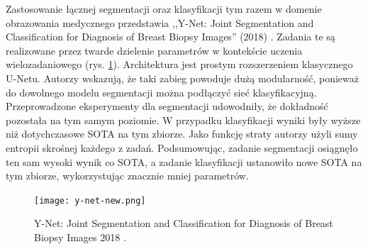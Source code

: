 \vspace{0.5cm}
Zastosowanie łącznej segmentacji oraz klasyfikacji tym razem w domenie obrazowania medycznego przedstawia ,,Y-Net: Joint Segmentation and Classification for Diagnosis of Breast Biopsy Images'' (2018) \cite{mehta2018net}. Zadania te są realizowane przez twarde dzielenie parametrów w kontekście uczenia wielozadaniowego (rys. \ref{fig:y-net}). Architektura jest prostym rozszerzeniem klasycznego U-Netu. Autorzy wskazują, że taki zabieg powoduje dużą modularność, ponieważ do dowolnego modelu segmentacji można podłączyć sieć klasyfikacyjną. Przeprowadzone eksperymenty dla segmentacji udowodniły, że dokładność pozostała na tym samym poziomie. W przypadku klasyfikacji wyniki były wyższe niż dotychczasowe SOTA na tym zbiorze. Jako funkcję straty autorzy użyli sumy entropii skrośnej każdego z zadań. Podsumowując, zadanie segmentacji osiągnęło ten sam wysoki wynik co SOTA, a zadanie klasyfikacji ustanowiło nowe SOTA na tym zbiorze, wykorzystując znacznie mniej parametrów.


\begin{figure}[ht!]
    \texttt{[image: y-net-new.png]}
    \caption{Y-Net: Joint Segmentation and Classification for Diagnosis of Breast Biopsy Images 2018 \cite{mehta2018net}.}
    \label{fig:y-net}
\end{figure}

\vspace{0.5cm}

